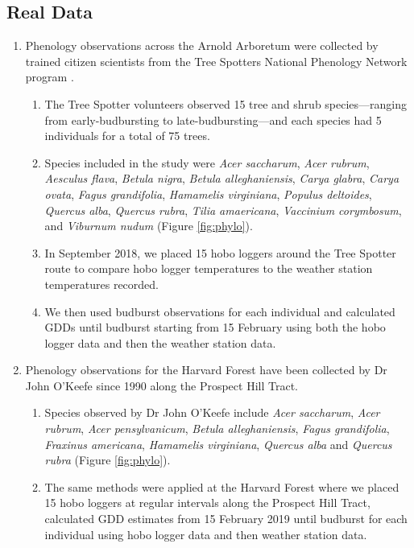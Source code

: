\documentclass{article}\usepackage[]{graphicx}\usepackage[]{color}
\begin{document}
\subsection*{Real Data}
\begin{enumerate}
\item Phenology observations across the Arnold Arboretum were collected by trained citizen scientists from the Tree Spotters National Phenology Network program \citep{USA-NPN2016}. 
  \begin{enumerate}
  \item The Tree Spotter volunteers observed 15 tree and shrub species---ranging from early-budbursting to late-budbursting---and each species had 5 individuals for a total of 75 trees.
  \item Species included in the study were \textit{Acer saccharum}, \textit{Acer rubrum}, \textit{Aesculus flava}, \textit{Betula nigra}, \textit{Betula alleghaniensis}, \textit{Carya glabra}, \textit{Carya ovata}, \textit{Fagus grandifolia}, \textit{Hamamelis virginiana}, \textit{Populus deltoides}, \textit{Quercus alba}, \textit{Quercus rubra}, \textit{Tilia amaericana}, \textit{Vaccinium corymbosum}, and \textit{Viburnum nudum} (Figure \ref{fig:phylo}).  
  \item In September 2018, we placed 15 hobo loggers around the Tree Spotter route to compare hobo logger temperatures to the weather station temperatures recorded. 
  \item We then used budburst observations for each individual and calculated GDDs until budburst starting from 15 February using both the hobo logger data and then the weather station data. 
  \end{enumerate}

\item Phenology observations for the Harvard Forest have been collected by Dr John O'Keefe since 1990 \citep{OKeefe2014} along the Prospect Hill Tract. 
  \begin{enumerate}
  \item Species observed by Dr John O'Keefe include \textit{Acer saccharum}, \textit{Acer rubrum}, \textit{Acer pensylvanicum}, \textit{Betula alleghaniensis}, \textit{Fagus grandifolia}, \textit{Fraxinus americana}, \textit{Hamamelis virginiana}, \textit{Quercus alba} and \textit{Quercus rubra} (Figure \ref{fig:phylo}).
  \item The same methods were applied at the Harvard Forest where we placed 15 hobo loggers at regular intervals along the Prospect Hill Tract, calculated GDD estimates from 15 February 2019 until budburst for each individual using hobo logger data and then weather station data. 
  \end{enumerate}
\end{enumerate}
  
\end{document}
